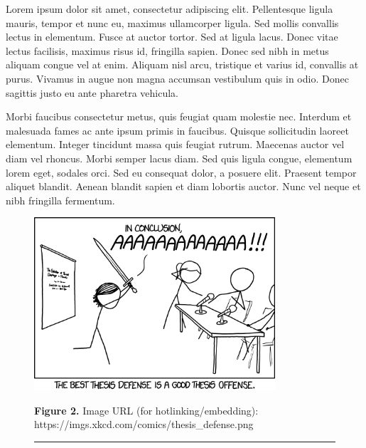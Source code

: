 \begin{multicols}{2}
 Lorem ipsum dolor sit amet, consectetur adipiscing elit. Pellentesque ligula 
mauris, tempor et nunc eu, maximus ullamcorper ligula. Sed mollis convallis 
lectus in elementum. Fusce at auctor tortor. Sed at ligula lacus. Donec vitae 
lectus facilisis, maximus risus id, fringilla sapien. Donec sed nibh in metus 
aliquam congue vel at enim. Aliquam nisl arcu, tristique et varius id, convallis 
at purus. Vivamus in augue non magna accumsan vestibulum quis in odio. Donec 
sagittis justo eu ante pharetra vehicula.

Morbi faucibus consectetur metus, quis feugiat quam molestie nec. Interdum et 
malesuada fames ac ante ipsum primis in faucibus. Quisque sollicitudin laoreet 
elementum. Integer tincidunt massa quis feugiat rutrum. Maecenas auctor vel diam 
vel rhoncus. Morbi semper lacus diam. Sed quis ligula congue, elementum lorem 
eget, sodales orci. Sed eu consequat dolor, a posuere elit. Praesent tempor 
aliquet blandit. Aenean blandit sapien et diam lobortis auctor. Nunc vel neque 
et nibh fringilla fermentum. 

\end{multicols}


\begin{figure}[H]
 \begin{center}
 
\includegraphics[width=0.8\textwidth]
{chapters/chapter-template/fig-template/thesisdefense.png}

 \end{center}
 \textbf{Figure 2.} \small{{Image URL (for hotlinking/embedding): 
https://imgs.xkcd.com/comics/thesis\_defense.png}}
\rule{1.0\textwidth}{1.0pt}
\end{figure}


